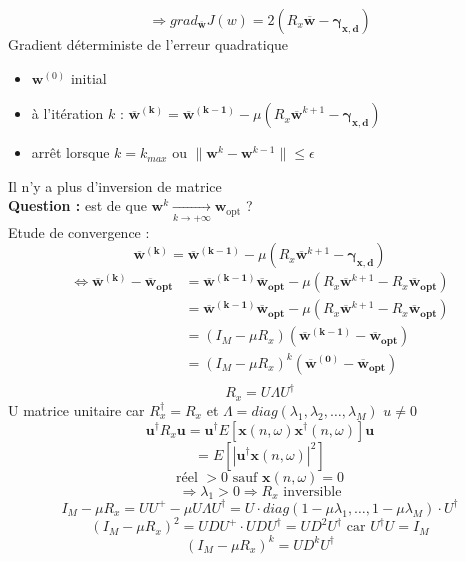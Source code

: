 \documentclass[12pt]{article}
\begin{document}
$$\Rightarrow \boxed{grad_\mathbf{\overline{w}} J(w) = 2(R_x \mathbf{\overline{w}} - \mathbf{\gamma_{x,d}})}$$
Gradient déterministe de l'erreur quadratique
\begin{itemize}
    \item $\mathbf{w}^{(0)}$ initial
    \item à l'itération $k$ : $\mathbf{\overline{w}^{(k)}} = \mathbf{\overline{w}^{(k-1)}} - \mu (R_x \mathbf{\overline{w}}^{k+1} - \mathbf{\gamma_{x,d}})$ 
    \item arrêt lorsque $k=k_{max}$ ou $\| \mathbf{w}^{k}-\mathbf{w}^{k-1} \| \leq \epsilon$
\end{itemize}
Il n'y a plus d'inversion de matrice \\ %
\textbf{Question :} est de que $\mathbf{w}^{k} \underset{k \to +\infty}{\longrightarrow} \mathbf{w}_{\text{opt}}$ ?\\
Etude de convergence : $$\mathbf{\overline{w}^{(k)}} = \mathbf{\overline{w}^{(k-1)}} - \mu (R_x \mathbf{\overline{w}}^{k+1} - \mathbf{\gamma_{x,d}})$$
\begin{align}
    \Leftrightarrow \mathbf{\overline{w}^{(k)}} - \mathbf{\overline{w}_{opt}} &= \mathbf{\overline{w}^{(k-1)}} \mathbf{\overline{w}_{opt}} - \mu (R_x \mathbf{\overline{w}}^{k+1} - R_x \mathbf{\overline{w}_{opt}}) \nonumber \\
    &= \mathbf{\overline{w}^{(k-1)}} \mathbf{\overline{w}_{opt}} - \mu (R_x \mathbf{\overline{w}}^{k+1} - R_x \mathbf{\overline{w}_{opt}}) \nonumber \\
    &= (I_M - \mu R_x)(\mathbf{\overline{w}^{(k-1)}} - \mathbf{\overline{w}_{opt}}) \nonumber \\
    &= (I_M - \mu R_x)^{k}(\mathbf{\overline{w}^{(0)}} - \mathbf{\overline{w}_{opt}}) \nonumber \\
\end{align}
$$R_x = U \Lambda U^\dag$$ 
U matrice unitaire car $R_x^\dag = R_x$
et $\Lambda = diag(\lambda_1, \lambda_2, \dots ,\lambda_M)$
$u \neq 0$ $$\mathbf{u^\dag} R_x \mathbf{u}=\mathbf{u^\dag} E[\mathbf{x}(n,\omega) \mathbf{x}^\dag (n,\omega)]\mathbf{u} $$
$$= E\left[ |\mathbf{u}^\dag \mathbf{x}(n,\omega) |^2 \right]$$
$$\text{réel }>0 \text{ sauf } \mathbf{x}(n,\omega)=0 $$
$$\Rightarrow \lambda_1 > 0 \Rightarrow R_x \text{ inversible}$$
$$I_M - \mu R_x = UU^+ - \mu U\Lambda U^\dag = U\cdot diag(1- \mu \lambda_1, \dots, 1- \mu \lambda_M)\cdot U^\dag$$
$$(I_M - \mu R_x)^2 = UDU^+ \cdot UDU^\dag = UD^2U^\dag \text{ car } U^\dag U = I_M$$
$$(I_M - \mu R_x)^k = UD^kU^\dag$$
\end{document}
